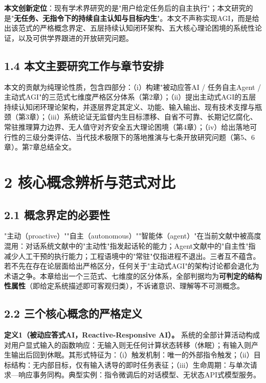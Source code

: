 \documentclass[11pt,a4paper]{ctexart}
\begin{document}
\textbf{本文创新定位}：现有学术界研究的是"用户给定任务后的自主执行"；本文研究的是"\textbf{无任务、无指令下的持续自主认知与目标内生}"。本文不声称实现AGI，而是给出该范式的严格概念界定、五层持续认知闭环架构、五大核心理论困境的系统性论证，以及可供学界跟进的开放研究问题。

\subsection{1.4 本文主要研究工作与章节安排}

本文的贡献为纯理论性质，包含四部分：（i）构建"被动应答AI / 任务自主Agent / 主动式AGI"的三范式七维度严格区分体系（第2章）；（ii）提出主动式AGI的五层持续认知闭环理论架构，并逐层界定其定义、功能、输入输出、现有技术支撑与瓶颈（第3章）；（iii）系统论证无监督内生目标漂移、自省不可靠、长期记忆腐化、常驻推理算力边界、无人值守对齐安全五大理论困境（第4章）；（iv）给出落地可行性的三级分类评估、当代技术极限下的落地推演与七条开放研究问题（第5、6章）。第7章总结全文。

\section{2 核心概念辨析与范式对比}

\subsection{2.1 概念界定的必要性}

"主动（proactive）""自主（autonomous）""智能体（agent）"在当前文献中被高度混用：对话系统文献中的"主动性"指发起话轮的能力；Agent文献中的"自主性"指减少人工干预的执行能力；工程语境中的"常驻"仅指进程不退出。三者互不蕴含。若不先在存在论层面给出严格区分，任何关于"主动式AGI"的架构讨论都会退化为术语之争。本章给出一个三范式、七维度的区分体系，全部判据均为\textbf{可判定的结构性属性}（即给定系统描述即可客观归类），不诉诸意识、理解等不可测概念。

\subsection{2.2 三个核心概念的严格定义}

\textbf{定义1（被动应答式AI，Reactive-Responsive AI）。} 系统的全部计算活动构成对用户显式输入的函数响应：无输入则无任何计算状态转移（休眠）；有输入则产生输出后回到休眠。其形式特征为：（i）触发机制：唯一的外部指令触发；（ii）目标结构：无内部目标，仅有输入诱导的即时任务表征；（iii）生命周期：与单次请求—响应事务同构。典型实例：指令微调后的对话模型、无状态API式模型服务。
\end{document}
